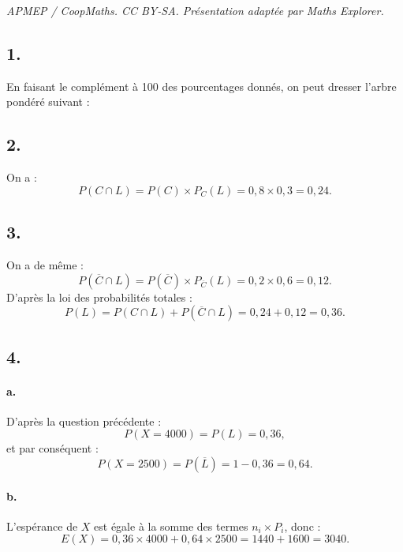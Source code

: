 \documentclass[10pt]{article}
\begin{document}
\noindent\textit{APMEP / CoopMaths. CC BY-SA. Présentation adaptée par Maths Explorer.}\par\medskip
\subsection*{1.}

En faisant le complément à 100 des pourcentages donnés, on peut dresser l'arbre pondéré suivant :

\begin{center}
\end{center}

\subsection*{2.}

On a :
\[
P(C \cap L) = P(C) \times P_C(L) = 0{,}8 \times 0{,}3 = 0{,}24.
\]

\subsection*{3.}

On a de même :
\[
P(\overline{C} \cap L) = P(\overline{C}) \times P_{\overline{C}}(L) = 0{,}2 \times 0{,}6 = 0{,}12.
\]
D'après la loi des probabilités totales :
\[
P(L) = P(C \cap L) + P(\overline{C} \cap L) = 0{,}24 + 0{,}12 = 0{,}36.
\]

\subsection*{4.}

\paragraph{a.} D'après la question précédente :
\[
P(X = 4000) = P(L) = 0{,}36,
\]
et par conséquent :
\[
P(X = 2500) = P(\overline{L}) = 1 - 0{,}36 = 0{,}64.
\]

\paragraph{b.} L'espérance de \(X\) est égale à la somme des termes \(n_i \times P_i\), donc :
\[
E(X) = 0{,}36 \times 4000 + 0{,}64 \times 2500 = 1440 + 1600 = 3040.
\]
\end{document}
